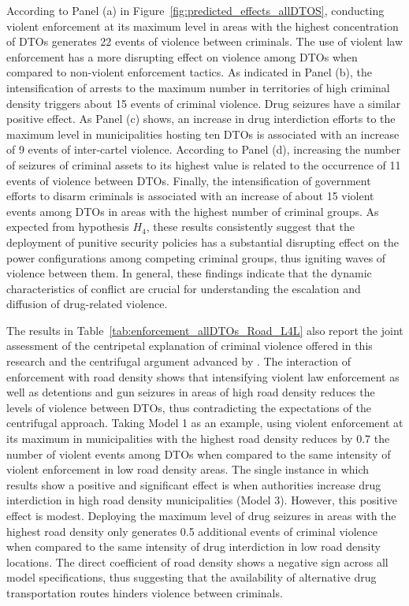 \documentclass[12pt,letterpaper]{article}
\begin{document}
According to Panel (a) in Figure~\ref{fig:predicted_effects_allDTOS}, conducting violent enforcement at its maximum level in areas with the highest concentration of DTOs generates 22 events of violence between criminals. The use of violent law enforcement has a more disrupting effect on violence among DTOs when compared to non-violent enforcement tactics. As indicated in Panel (b), the intensification of arrests to the maximum number in territories of high criminal density triggers about 15 events of criminal violence. Drug seizures have a similar positive effect. As Panel (c) shows, an increase in drug interdiction efforts to the maximum level in municipalities hosting ten DTOs is associated with an increase of 9 events of inter-cartel violence. According to Panel (d), increasing the number of seizures of criminal assets to its highest value is related to the occurrence of 11 events of violence between DTOs. Finally, the intensification of government efforts to disarm criminals is associated with an increase of about 15 violent events among DTOs in areas with the highest number of criminal groups. As expected from hypothesis $H_{4}$, these results consistently suggest that the deployment of punitive security policies has a substantial disrupting effect on the power configurations among competing criminal groups, thus igniting waves of violence between them. In general, these findings indicate that the dynamic characteristics of conflict are crucial for understanding the escalation and diffusion of drug-related violence.


The results in Table~\ref{tab:enforcement_allDTOs_Road_L4L} also report the joint assessment of the centripetal explanation of criminal violence offered in this research and the centrifugal argument advanced by \citet{Dell2011}. The interaction of enforcement with road density shows that intensifying violent law enforcement as well as detentions and gun seizures in areas of high road density reduces the levels of violence between DTOs, thus contradicting the expectations of the centrifugal approach. Taking Model 1 as an example, using violent enforcement at its maximum in municipalities with the highest road density reduces by 0.7 the number of violent events among DTOs when compared to the same intensity of violent enforcement in low road density areas. The single instance in which results show a positive and significant effect is when authorities increase drug interdiction in high road density municipalities (Model 3). However, this positive effect is modest. Deploying the maximum level of drug seizures in areas with the highest road density only generates 0.5 additional events of criminal violence when compared to the same intensity of drug interdiction in low road density locations.  
The direct coefficient of road density shows a negative sign across all model specifications, 
thus suggesting that the availability of alternative drug transportation routes hinders violence between criminals. 
\end{document}
